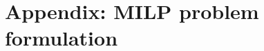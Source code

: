 {\appendices
\vspace{-1mm}
\section*{Appendix: MILP problem formulation}\label{appendix:A}








}
